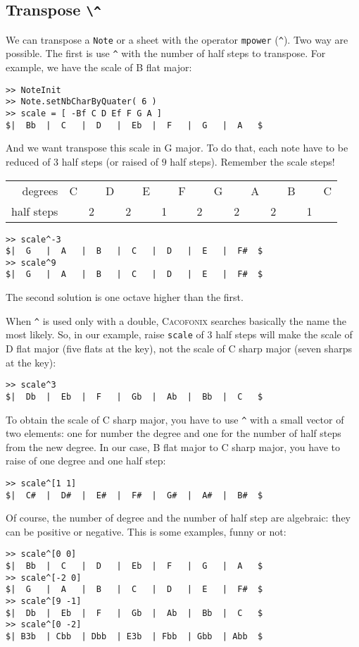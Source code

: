 \documentclass{article}
\newcommand{\cacofonix}{\textsc{Cacofonix}\xspace}
\newcommand{\note}{\lstinline!Note!\xspace}
\begin{document}
\subsection{Transpose \lstinline!\^!}
\label{sec:Transpose}

We can transpose a \note or a sheet with the operator \lstinline!mpower! (\lstinline!^!). Two way are possible. The first is use \lstinline!^! with the number of half steps to transpose.
For example, we have the scale of B flat major:
\begin{lstlisting}
>> NoteInit
>> Note.setNbCharByQuater( 6 )
>> scale = [ -Bf C D Ef F G A ]
$|  Bb  |  C   |  D   |  Eb  |  F   |  G   |  A   $
\end{lstlisting}
And we want transpose this scale in G major. To do that, each note have to be reduced of $3$ half steps (or raised of $9$ half steps). Remember the scale steps!
\begin{center}
\begin{tabular}{rccccccccccccccc}
degrees    & C &   & D &   & E &   & F &   & G &   & A &   & B &   & C \\
half steps &   & 2 &   & 2 &   & 1 &   & 2 &   & 2 &   & 2 &   & 1 & \\
\end{tabular}
\end{center}
\begin{lstlisting}
>> scale^-3
$|  G   |  A   |  B   |  C   |  D   |  E   |  F#  $
>> scale^9
$|  G   |  A   |  B   |  C   |  D   |  E   |  F#  $
\end{lstlisting}
The second solution is one octave higher than the first.

When \lstinline!^! is used only with a double, \cacofonix searches basically the name the most likely. So, in our example, raise \lstinline!scale! of $3$ half steps will make the scale of D flat major (five flats at the key), not the scale of C sharp major (seven sharps at the key):
\begin{lstlisting}
>> scale^3
$|  Db  |  Eb  |  F   |  Gb  |  Ab  |  Bb  |  C   $
\end{lstlisting}
To obtain the scale of C sharp major, you have to use \lstinline!^! with a small vector of two elements: one for number the degree and one for the number of half steps from the new degree. In our case, B flat major to C sharp major, you have to raise of one degree and one half step:
\begin{lstlisting}
>> scale^[1 1]
$|  C#  |  D#  |  E#  |  F#  |  G#  |  A#  |  B#  $
\end{lstlisting}
Of course, the number of degree and the number of half step are algebraic: they can be positive or negative. This is some examples, funny or not:
\begin{lstlisting}
>> scale^[0 0]
$|  Bb  |  C   |  D   |  Eb  |  F   |  G   |  A   $
>> scale^[-2 0]
$|  G   |  A   |  B   |  C   |  D   |  E   |  F#  $
>> scale^[9 -1]
$|  Db  |  Eb  |  F   |  Gb  |  Ab  |  Bb  |  C   $
>> scale^[0 -2]
$| B3b  | Cbb  | Dbb  | E3b  | Fbb  | Gbb  | Abb  $
\end{lstlisting}
\end{document}
